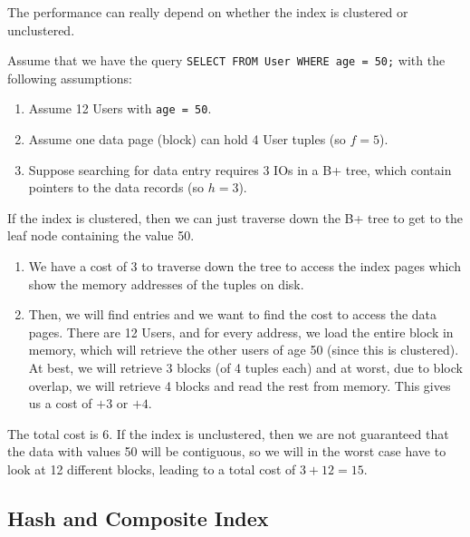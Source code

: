 \documentclass{article}
\begin{document}
    The performance can really depend on whether the index is clustered or unclustered. 

    \begin{example}
      Assume that we have the query \texttt{SELECT \* FROM User WHERE age = 50;} with the following assumptions: 
      \begin{enumerate}
        \item Assume 12 Users with \texttt{age = 50}. 
        \item Assume one data page (block) can hold 4 User tuples (so $f = 5$). 
        \item Suppose searching for data entry requires 3 IOs in a B+ tree, which contain pointers to the data records (so $h = 3$). 
      \end{enumerate}

      If the index is clustered, then we can just traverse down the B+ tree to get to the leaf node containing the value 50. 
      \begin{enumerate}
        \item We have a cost of 3 to traverse down the tree to access the index pages which show the memory addresses of the tuples on disk. 

        \item Then, we will find entries and we want to find the cost to access the data pages. There are 12 Users, and for every address, we load the entire block in memory, which will retrieve the other users of age 50 (since this is clustered). At best, we will retrieve 3 blocks (of 4 tuples each) and at worst, due to block overlap, we will retrieve 4 blocks and read the rest from memory. This gives us a cost of $+3$ or $+4$. 
      \end{enumerate}
      The total cost is 6. If the index is unclustered, then we are not guaranteed that the data with values 50 will be contiguous, so we will in the worst case have to look at 12 different blocks, leading to a total cost of $3 + 12 = 15$. 
    \end{example}

  \subsection{Hash and Composite Index}
\end{document}
